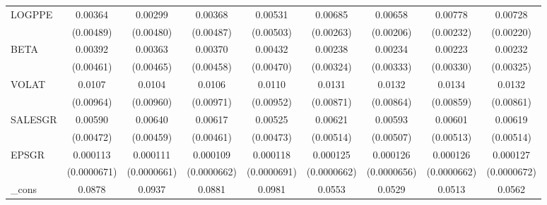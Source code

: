 \begin{table}[htbp]
\begin{tabular}{l*{8}{c}}
LOGPPE              &     0.00364         &     0.00299         &     0.00368         &     0.00531         &     0.00685\sym{**} &     0.00658\sym{***}&     0.00778\sym{***}&     0.00728\sym{***}\\
                    &   (0.00489)         &   (0.00480)         &   (0.00487)         &   (0.00503)         &   (0.00263)         &   (0.00206)         &   (0.00232)         &   (0.00220)         \\
BETA                &     0.00392         &     0.00363         &     0.00370         &     0.00432         &     0.00238         &     0.00234         &     0.00223         &     0.00232         \\
                    &   (0.00461)         &   (0.00465)         &   (0.00458)         &   (0.00470)         &   (0.00324)         &   (0.00333)         &   (0.00330)         &   (0.00325)         \\
VOLAT               &      0.0107         &      0.0104         &      0.0106         &      0.0110         &      0.0131         &      0.0132         &      0.0134         &      0.0132         \\
                    &   (0.00964)         &   (0.00960)         &   (0.00971)         &   (0.00952)         &   (0.00871)         &   (0.00864)         &   (0.00859)         &   (0.00861)         \\
SALESGR             &     0.00590         &     0.00640         &     0.00617         &     0.00525         &     0.00621         &     0.00593         &     0.00601         &     0.00619         \\
                    &   (0.00472)         &   (0.00459)         &   (0.00461)         &   (0.00473)         &   (0.00514)         &   (0.00507)         &   (0.00513)         &   (0.00514)         \\
EPSGR               &    0.000113\sym{*}  &    0.000111\sym{*}  &    0.000109         &    0.000118\sym{*}  &    0.000125\sym{*}  &    0.000126\sym{*}  &    0.000126\sym{*}  &    0.000127\sym{*}  \\
                    & (0.0000671)         & (0.0000661)         & (0.0000662)         & (0.0000691)         & (0.0000662)         & (0.0000656)         & (0.0000662)         & (0.0000672)         \\
\_cons              &      0.0878\sym{*}  &      0.0937\sym{*}  &      0.0881\sym{*}  &      0.0981\sym{**} &      0.0553\sym{*}  &      0.0529         &      0.0513         &      0.0562\sym{*}  \\

\end{tabular}
\end{table}
